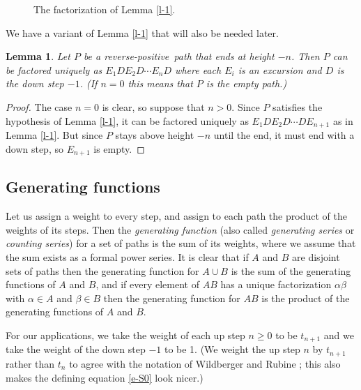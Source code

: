 \documentclass[12pt,reqno, oneside]{amsart}
\newtheorem{lem}[thm]{Lemma}
\newcommand{\rp}{reverse-positive}
\begin{document}
\begin{figure}[h]
\caption{The factorization of Lemma \ref{l-1}.}
\label{f-l-1}
\end{figure}

We have a variant of Lemma \ref{l-1} that will also be needed later.

\begin{lem}
\label{l-2}
Let $P$ be a \rp\ path that ends at height $-n$.
Then $P$ can be factored uniquely as $E_1 D E_2 D \cdots E_n D$ where each $E_i$ is an excursion and $D$ is the down step $-1$. \textup(If $n=0$ this means that $P$ is the empty path.\textup)
\end{lem}
\begin{proof}
The case $n=0$ is clear, so suppose that $n>0$.
Since $P$ satisfies the hypothesis of Lemma \ref{l-1}, it can be factored uniquely as $E_1 D E_2 D \cdots DE_{n+1}$ as in
Lemma \ref{l-1}. But since  $P$ stays above  height $-n$ until the end, it must end with a down step, so $E_{n+1}$ is empty.
\end{proof}


\subsection{Generating functions}
Let us assign a weight to every step, and assign to each path the product of the weights of its steps. Then the \emph{generating function} (also called \emph{generating series} or \emph{counting series}) for a set of paths is the sum of its weights, where we assume that the sum exists as a formal power series.  It is clear that if $A$ and $B$ are disjoint sets of paths then the generating function for $A\cup B$ is the sum of the generating functions of $A$ and $B$, and if every element of $AB$ has a unique factorization $\alpha\beta$ with $\alpha\in A$ and $\beta\in B$ then the generating function for $AB$ is the product of the generating functions of $A$ and $B$.

For our applications, we take the weight of each up step $n\ge0$ to be $t_{n+1}$ and we take the weight of the  down step $-1$ to be 1. 
(We weight the up step $n$ by $t_{n+1}$  rather than $t_n$ to agree with the notation of Wildberger and Rubine \cite{wr}; this also makes the defining equation \eqref{e-S0} look nicer.)
\end{document}
